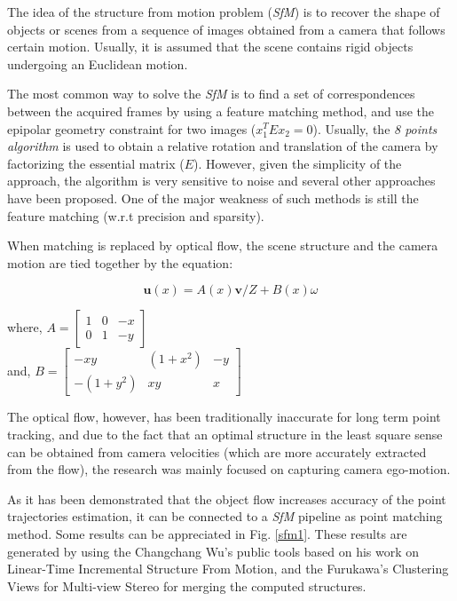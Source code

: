 The idea of the structure from motion problem ({\it SfM}) is to 
recover the shape of objects or scenes from a sequence of images obtained from a camera that follows certain motion. Usually, it is assumed that 
the scene contains rigid objects undergoing an 
Euclidean motion.

The most common way to solve the {\it SfM} is to 
find a set of correspondences between the acquired 
frames by using a feature matching method, and use the epipolar geometry constraint for two images 
($x_1^T E x_2 = 0$). Usually, the {\it 8 points algorithm} is used to obtain a relative rotation 
and translation of the camera by factorizing the 
essential matrix ($E$). However, given the simplicity of the approach, the algorithm is very sensitive to noise and several other approaches have 
been proposed. One of the major weakness of such 
methods is still the feature matching (w.r.t precision and sparsity). 

When matching is replaced by optical flow, the 
scene structure and the camera motion are tied 
together by the equation:

\begin{equation}
\textbf{u}(x) = A(x)\textbf{v}/Z + B(x)\omega   
\label{eq_dfc}
\end{equation}
\begin{center}
 where, $ A =  \left[ {\begin{array}{ccc} 1 & 0 & -x\\ 0 & 1 & -y \end{array} } \right]$ \\
 and, $ B =  \left[ {\begin{array}{ccc} -xy & (1+x^2) & -y\\ -(1+y^2) & xy & x \end{array} } \right]$
\end{center}

The optical flow, however, has been traditionally 
inaccurate for long term point tracking, and due to the fact that an optimal structure in the least square sense can 
be obtained from camera velocities (which are more accurately extracted from the flow), the research was 
mainly focused on capturing camera ego-motion. 

As it has been demonstrated that the object flow 
increases accuracy of the point trajectories estimation, it can be connected to a {\it SfM} 
pipeline as point matching method. Some results can be appreciated in Fig. \ref{sfm1}. These results are generated 
by using the Changchang Wu's public tools based on his work on Linear-Time Incremental Structure From Motion, and the Furukawa's 
Clustering Views for Multi-view Stereo for merging the computed structures.

